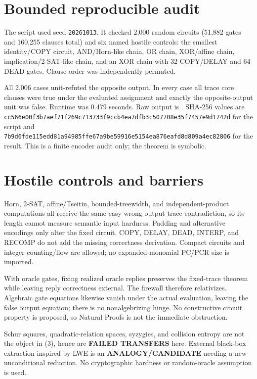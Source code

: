 \documentclass[11pt]{article}
\begin{document}
\section{Bounded reproducible audit}
The script  used seed
\texttt{20261013}.  It checked 2,000 random circuits (51,882 gates and 160,255
clauses total) and six named hostile controls: the smallest identity/COPY
circuit, AND/Horn-like chain, OR chain, XOR/affine chain,
implication/2-SAT-like chain, and an XOR chain with 32 COPY/DELAY and 64 DEAD
gates.  Clause order was independently permuted.

All 2,006 cases unit-refuted the opposite output.  In every case all trace
core clauses were true under the evaluated assignment and exactly the
opposite-output unit was false.  Runtime was 0.479 seconds.  Raw output is
.
SHA-256 values are
\texttt{cc566e00f3b7aef71f269c713733f9ccb4ea7dfb3c507708e35f7457e9d1742d}
for the script and
\texttt{7b9d6fde115edd81a94985ffe67a9be59916e5154ea876eafd8d809a4ec82806}
for the result.  This is a finite encoder audit only; the theorem is symbolic.

\section{Hostile controls and barriers}
Horn, 2-SAT, affine/Tseitin, bounded-treewidth, and independent-product
computations all receive the same easy wrong-output trace contradiction, so
its length cannot measure semantic input hardness.  Padding and alternative
encodings only alter the fixed circuit.  COPY, DELAY, DEAD, INTERP, and RECOMP
do not add the missing correctness derivation.  Compact circuits and integer
counting/flow are allowed; no expanded-monomial PC/PCR size is imported.

With oracle gates, fixing realized oracle replies preserves the fixed-trace
theorem while leaving reply correctness external.  The firewall therefore
relativizes.  Algebraic gate equations likewise vanish under the actual
evaluation, leaving the false output equation; there is no nonalgebrizing
hinge.  No constructive circuit property is proposed, so Natural Proofs is
not the immediate obstruction.

Schur squares, quadratic-relation spaces, syzygies, and collision entropy are
not the object in (3), hence are \textbf{FAILED TRANSFERS} here.  External
black-box extraction inspired by LWE is an \textbf{ANALOGY/CANDIDATE} needing
a new unconditional reduction.  No cryptographic hardness or random-oracle
assumption is used.
\end{document}
